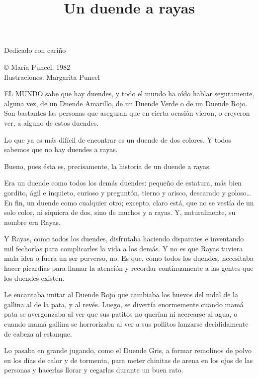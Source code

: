\documentclass{barcodevapor3pags}
\title{Un duende a rayas}
\author{}
\date{}
\begin{document}

\maketitle
\begin{center}
{Dedicado con cariño}


\vspace{3cm}

\small
© María Puncel, 1982\\
Ilustraciones: Margarita Puncel\\

\end{center}



 EL MUNDO sabe que hay duendes, y todo el mundo ha oído hablar
seguramente, alguna vez, de un Duende Amarillo, de un Duende Verde o de
un Duende Rojo. Son bastantes las personas que aseguran que en cierta
ocasión vieron, o creyeron ver, a alguno de estos duendes.

Lo que ya es más difícil de encontrar es un duende de dos colores. Y
todos sabemos que no hay duendes a rayas.

Bueno, pues ésta es, precisamente, la historia de un duende a rayas.

Era un duende como todos los demás duendes: pequeño de estatura, más
bien gordito, ágil e inquieto, curioso y preguntón, tierno y arisco,
descarado y goloso\ldots{} En fin, un duende como cualquier otro;
excepto, claro está, que no se vestía de un solo color, ni siquiera de
dos, sino de muchos y a rayas. Y, naturalmente, su nombre era Rayas.

Y Rayas, como todos los duendes, disfrutaba haciendo disparates e
inventando mil fechorías para complicarles la vida a los demás. Y no es
que Rayas tuviera mala idea o fuera un ser perverso, no. Es que, como
todos los duendes, necesitaba hacer picardías para llamar la atención y
recordar continuamente a las gentes que los duendes existen.

Le encantaba imitar al Duende Rojo que cambiaba los huevos del nidal de
la gallina al de la pata, y al revés. Luego, se divertía enormemente
cuando mamá pata se avergonzaba al ver que sus patitos no querían ni
acercarse al agua, o cuando mamá gallina se horrorizaba al ver a sus
pollitos lanzarse decididamente de cabeza al estanque.

Lo pasaba en grande jugando, como el Duende Gris, a formar remolinos de
polvo en los días de calor y de tormenta, para meter chinitas de arena
en los ojos de las personas y hacerlas llorar y cegarlas durante un buen
rato.
\end{document}
